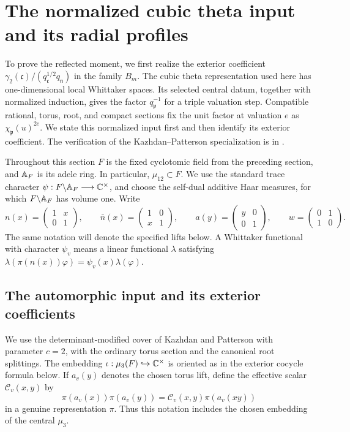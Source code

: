 \section{The normalized cubic theta input and its radial profiles}
\label{sec:theta}

To prove the reflected moment, we first realize the exterior coefficient
\(\gamma_2(\mathfrak c)/(q_{\mathfrak c}^{1/2}q_{\mathfrak n})\)
in the family \(B_m\).  The cubic theta representation used here has
one-dimensional local Whittaker spaces.  Its selected central datum,
together with normalized induction, gives the factor \(q_{\mathfrak p}^{-1}\)
for a triple valuation step.  Compatible rational, torus, root, and compact
sections fix the unit factor at valuation \(e\) as
\(\chi_{\mathfrak p}(u)^{2e}\).  We state this normalized input first and
then identify its exterior coefficient.  The verification of the
Kazhdan--Patterson specialization is in .

Throughout this section \(F\) is the fixed cyclotomic field from the
preceding section, and \(\mathbb{A}_F\) is its adele ring.  In particular,
\(\mu_{12}\subset F\).  We use the standard trace character
\(\psi:F\backslash\mathbb{A}_F\longrightarrow\mathbb{C}^\times\), and choose the
self-dual additive Haar measures, for which
\(F\backslash\mathbb{A}_F\) has volume one.  Write
\[
 n(x)=\begin{pmatrix}1&x\\0&1\end{pmatrix},\qquad
 \bar n(x)=\begin{pmatrix}1&0\\x&1\end{pmatrix},\qquad
 a(y)=\begin{pmatrix}y&0\\0&1\end{pmatrix},\qquad
 w=\begin{pmatrix}0&1\\1&0\end{pmatrix}.
\]
The same notation will denote the specified lifts below.  A Whittaker
functional with character \(\psi_v\) means a linear functional \(\lambda\)
satisfying
\(\lambda(\pi(n(x))\varphi)=\psi_v(x)\lambda(\varphi)\).

\subsection{The automorphic input and its exterior coefficients}

We use the determinant-modified cover of Kazhdan and Patterson with
parameter \(c=2\), with the ordinary torus section and the canonical root
splittings.  The embedding \(\iota:\mu_3(F)\hookrightarrow\mathbb{C}^\times\)
is oriented as in the exterior cocycle formula below.  If \(a_v(y)\)
denotes the chosen torus lift, define the effective scalar
\(\mathcal C_v(x,y)\) by
\[
 \pi(a_v(x))\pi(a_v(y))
   =\mathcal C_v(x,y)\pi(a_v(xy))
\]
in a genuine representation \(\pi\).  Thus this notation includes the
chosen embedding of the central \(\mu_3\).

